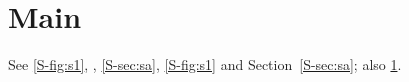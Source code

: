 \documentclass{article}
\begin{document}
\section{Main}\label{sec:main}
See \cref{S-fig:s1}, , \autoref{S-sec:sa}, \autoref*{S-fig:s1} and Section~\ref{S-sec:sa}; also \cref{sec:main}.
\end{document}
